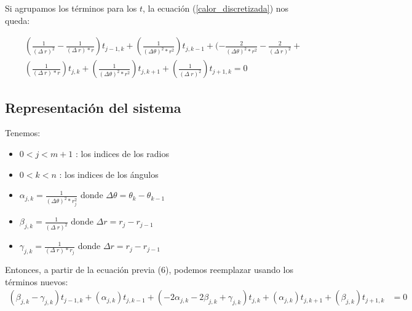 Si agrupamos los términos para los $t$, la ecuación (\ref{calor_discretizada}) nos queda:

\begin{equation}
   \begin{aligned}
    &(\frac{1}{(\Delta\ r)^2} - \frac{1}{(\Delta\ r) * r})t_{j-1,k} + (\frac{1}{(\Delta\theta)^2 * r^2})t_{j,k-1} +  (-\frac{2}{(\Delta\theta)^2 * r^2}-\frac{2}{(\Delta\ r)^2} +\\
    &(\frac{1} {(\Delta\ r) * r})t_{j,k} + (\frac{1}{(\Delta\theta)^2 * r^2})t_{j,k+1} + (\frac{1}{(\Delta\ r)^2})t_{j+1,k} = 0
    \end{aligned}
\end{equation}

\subsection{Representación del sistema}

Tenemos:
\begin{itemize}
    \item $0 < j < m+1$ : los indices de los radios
    \item $0 < k < n$ : los indices de los ángulos
    \item $\alpha_{j,k} = \frac{1}{(\Delta\theta)^2 * r_{j}^2}$ donde $\Delta\theta = \theta_{k}-\theta_{k-1}$
    \item $\beta_{j,k} = \frac{1}{(\Delta\ r)^2}$ donde $\Delta r = r_{j}-r_{j-1}$
    \item $\gamma_{j,k} = \frac{1}{(\Delta\ r) * r_j}$ donde $\Delta r = r_{j}-r_{j-1}$
\end{itemize}

Entonces, a partir de la ecuación previa (6), podemos reemplazar usando los términos nuevos:
\begin{equation}
   \begin{aligned}
      (\beta_{j,k} - \gamma_{j,k})t_{j-1,k} + 
      (\alpha_{j,k})t_{j,k-1} + 
      (-2\alpha_{j,k}-2\beta_{j,k}+\gamma_{j,k})t_{j,k} + 
      (\alpha_{j,k})t_{j,k+1} + 
      (\beta_{j,k})t_{j+1,k} &= 0\\
    \end{aligned}
\end{equation}

